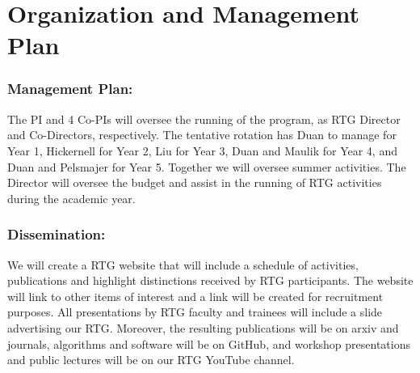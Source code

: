 \documentclass[11pt]{NSFamsart}
\begin{document}
 


\section{Organization and Management Plan }
 

 
\subsubsection*{Management Plan:}
 The PI and 4 Co-PIs will oversee the running of the program, as RTG Director  and Co-Directors, respectively.  The tentative rotation has Duan to manage for Year 1, Hickernell for Year 2,    Liu for  Year 3,    Duan and Maulik for Year 4, and Duan and Pelsmajer for Year 5.   Together we     will oversee summer activities.  
The Director will oversee
the budget and assist in the running of RTG activities during the academic year. 


 \subsubsection*{Dissemination:} 
 We will create a   RTG website that will include a schedule of activities, publications and highlight
distinctions received by RTG participants. The website will link to other items of interest and a link will
be created for recruitment purposes. All presentations by RTG faculty and trainees  will    include a slide advertising our RTG.
Moreover, the resulting publications   will be on arxiv and journals, algorithms and software will be on GitHub, and workshop  presentations and  public lectures will be on our RTG YouTube channel.

 
\end{document}
